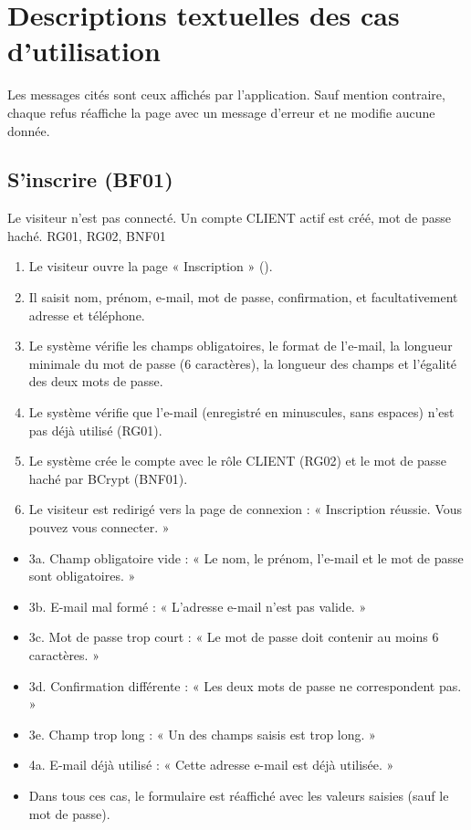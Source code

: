 \chapter{Descriptions textuelles des cas d'utilisation}\label{chap:cas}

Les messages cités sont ceux affichés par l'application. Sauf mention contraire, chaque refus réaffiche la
page avec un message d'erreur et ne modifie aucune donnée.

\section{S'inscrire (BF01)}

  {Le visiteur n'est pas connecté.}
  {Un compte CLIENT actif est créé, mot de passe haché.}
  {RG01, RG02, BNF01}

\begin{enumerate}
  \item Le visiteur ouvre la page « Inscription » ().
  \item Il saisit nom, prénom, e-mail, mot de passe, confirmation, et facultativement adresse et téléphone.
  \item Le système vérifie les champs obligatoires, le format de l'e-mail, la longueur minimale du mot de passe
        (6 caractères), la longueur des champs et l'égalité des deux mots de passe.
  \item Le système vérifie que l'e-mail (enregistré en minuscules, sans espaces) n'est pas déjà utilisé (RG01).
  \item Le système crée le compte avec le rôle CLIENT (RG02) et le mot de passe haché par BCrypt (BNF01).
  \item Le visiteur est redirigé vers la page de connexion : « Inscription réussie. Vous pouvez vous connecter. »
\end{enumerate}

\begin{itemize}
  \item 3a. Champ obligatoire vide : « Le nom, le prénom, l'e-mail et le mot de passe sont obligatoires. »
  \item 3b. E-mail mal formé : « L'adresse e-mail n'est pas valide. »
  \item 3c. Mot de passe trop court : « Le mot de passe doit contenir au moins 6 caractères. »
  \item 3d. Confirmation différente : « Les deux mots de passe ne correspondent pas. »
  \item 3e. Champ trop long : « Un des champs saisis est trop long. »
  \item 4a. E-mail déjà utilisé : « Cette adresse e-mail est déjà utilisée. »
  \item Dans tous ces cas, le formulaire est réaffiché avec les valeurs saisies (sauf le mot de passe).
\end{itemize}

